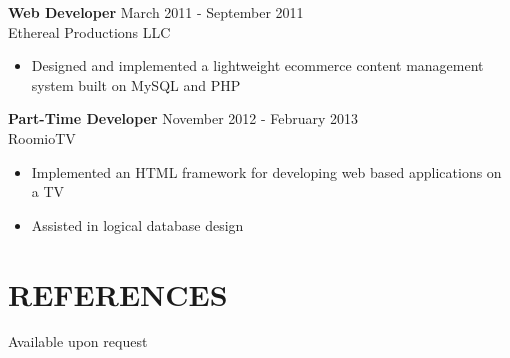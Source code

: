 \documentclass[line,margin]{res}
\begin{document}
\begin{resume}
                {\bf Web Developer} \hfill            March 2011 - September 2011 \\
                Ethereal Productions LLC
                 \begin{itemize}  \itemsep -2pt %
                 \item Designed and implemented a lightweight ecommerce content management system built on MySQL and PHP
                 \end{itemize} 


   
                {\bf Part-Time Developer} \hfill            November 2012 - February 2013\\
                  RoomioTV
                  \begin{itemize}  \itemsep -2pt %
                     \item Implemented an HTML framework for developing web based applications on a TV
                     \item Assisted in logical database design
                 \end{itemize} 
 
	
	
\section{REFERENCES}
	Available upon request


             
\end{resume}
\end{document}
